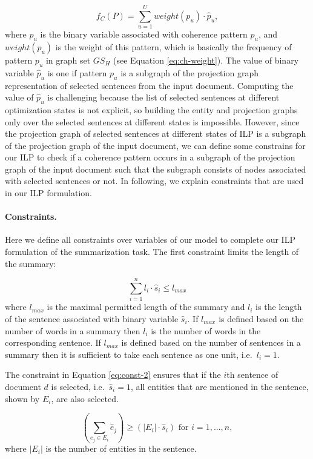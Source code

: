 \begin{equation}
f_C(P) = \sum_{u=1}^{U}{weight(p_u) \cdot \hat{p}_u},
\end{equation}
where $\hat{p}_u$ is the binary variable associated with coherence pattern $p_u$, and $weight(p_u)$ is the weight of this pattern, which is basically the frequency of pattern $p_u$ in graph set $GS_H$ (see Equation \ref{eq:ch-weight}). 
The value of binary variable $\hat{p}_u$ is one if pattern $p_u$ is a subgraph of the projection graph representation of selected sentences from the input document.  
Computing the value of $\hat{p}_u$ is challenging because the list of selected sentences at different optimization states is not explicit, so building the entity and projection graphs only over the selected sentences at different states is impossible. 
However, since the projection graph of selected sentences at different states of ILP is a subgraph of the projection graph of the input document, we can define some constrains for our ILP to check if a coherence pattern occurs in a subgraph of the projection graph of the input document such that the subgraph consists of nodes associated with selected sentences or not. 
In following, we explain constraints that are used in our ILP formulation. 

\paragraph{Constraints.}
Here we define all constraints over variables of our model to complete our ILP formulation of the summarization task. 
The first constraint limits the length of the summary:

\begin{equation}
\sum_{i=1}^{n} l_i \cdot \hat{s}_i \le l_{max}
\end{equation}
where $l_{max}$ is the maximal permitted length of the summary and $l_i$ is the length of the sentence associated with binary variable $\hat{s}_i$.  
If $l_{max}$ is defined based on the number of words in a summary then $l_i$ is the number of words in the corresponding sentence.  
If $l_{max}$ is defined based on the number of sentences in a summary then it is sufficient to take each sentence as one unit, i.e.\ $l_i=1$. 

The constraint in Equation \ref{eq:const-2} ensures that if the $i$th sentence of document $d$ is selected, i.e.\ $\hat{s}_i = 1$, all entities that are mentioned in the sentence, shown by $E_i$, are also selected. 

\begin{equation}
\label{eq:const-2}
( \sum_{e_j\in E_i}{\hat{e}_j} )  \ge (|E_i| \cdot \hat{s}_i) \text{   for   }i = 1,...,n,
\end{equation} 
where $|E_i|$ is the number of entities in the sentence.  

